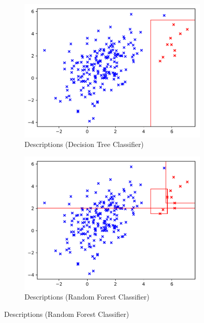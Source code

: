 \documentclass{article} %
\begin{document}
\begin{figure}
\begin{subfigure}[b]{0.3\textwidth}
    	\includegraphics[width=\textwidth, clip=true, trim=0mm 0mm 0mm 0mm]{avc_dataset_5_decision_tree_descriptions}
    	\caption{Descriptions (Decision Tree Classifier)}
    	\label{fig:aad}
    \end{subfigure}
    \begin{subfigure}[b]{0.3\textwidth}
    	\includegraphics[width=\textwidth, clip=true, trim=0mm 0mm 0mm 0mm]{avc_dataset_5_random_forest_descriptions}
    	\caption{Descriptions (Random Forest Classifier)}
    	\label{fig:rf}
    \end{subfigure}

\end{figure}
\end{document}
